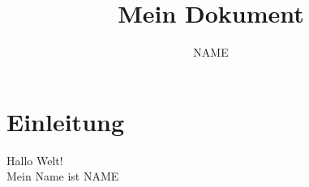 \documentclass{article}
\title{Mein Dokument}
\author{NAME}
\begin{document}
\maketitle
\section{Einleitung}
Hallo Welt! \\
Mein Name ist NAME



\end{document}
